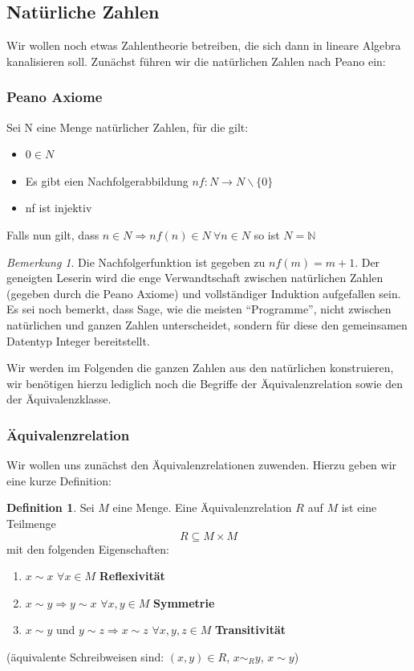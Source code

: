 \documentclass[fontsize=12pt,paper=a4,twoside,bibtotoc,idxtotoc,
liststotoc,pagesize,BCOR1.2cm,DIV15,chapterprefix,pagesize=pdftex]{scrbook}
\theoremstyle{plain}
\theoremstyle{definition}
\newtheorem{df}[equation]{Definition}
\theoremstyle{remark}
\newtheorem{bem}[equation]{Bemerkung}
\begin{document}
\subsection{Natürliche Zahlen}
Wir wollen noch etwas Zahlentheorie betreiben, die sich dann in lineare Algebra kanalisieren soll. Zunächst führen wir die natürlichen Zahlen nach Peano ein:
\subsubsection{Peano Axiome}
Sei N eine Menge natürlicher Zahlen, für die gilt:
\begin{itemize}
 \item $0 \in N$
 \item Es gibt eien Nachfolgerabbildung $nf:N\rightarrow N\smallsetminus\{0\}$
 \item nf ist injektiv
\end{itemize}
Falls nun gilt, dass $n\in N\Longrightarrow nf(n)\in N \ \forall n\in N$ so ist $N = \mathbb{N}$
\begin{bem}
 Die Nachfolgerfunktion ist gegeben zu $nf(m)=m+1$. Der geneigten Leserin wird die enge Verwandtschaft zwischen natürlichen Zahlen (gegeben 
durch die Peano Axiome) und vollständiger Induktion aufgefallen sein. Es sei noch bemerkt, dass Sage, wie die meisten ``Programme'', nicht 
zwischen natürlichen und ganzen Zahlen unterscheidet, sondern für diese den gemeinsamen Datentyp Integer bereitstellt.
\end{bem}
Wir werden im Folgenden die ganzen Zahlen aus den natürlichen konstruieren, wir benötigen hierzu lediglich noch die Begriffe der Äquivalenzrelation 
sowie den der Äquivalenzklasse.
\subsubsection{Äquivalenzrelation}
Wir wollen uns zunächst den Äquivalenzrelationen zuwenden. Hierzu geben wir eine kurze Definition:
\begin{df}
 Sei $M$ eine Menge. Eine Äquivalenzrelation $R$ auf $M$ ist eine Teilmenge
\[R\subseteq M\times M\] mit den folgenden Eigenschaften:
\begin{enumerate}
 \item $x \sim x$ $\forall x\in M$ \textbf{Reflexivität}
 \item $x \sim y\Rightarrow y\sim x$ $\forall x,y\in M$ \textbf{Symmetrie}
 \item $x\sim y$ und $y\sim z\Rightarrow x\sim z$ $\forall x,y,z\in M$ \textbf{Transitivität}
\end{enumerate}
(äquivalente Schreibweisen sind: $(x,y)\in R$, $x\sim_R y$, $x\sim y$)
\end{df}
\end{document}
